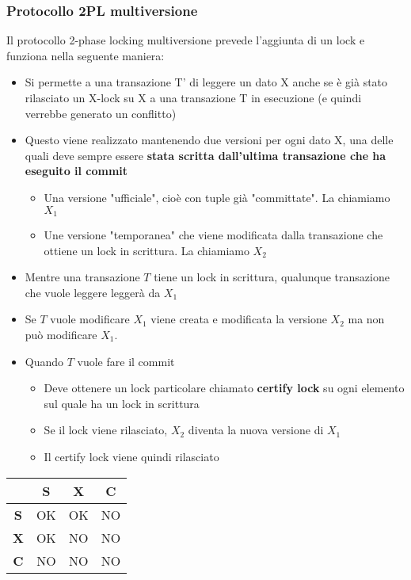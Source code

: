 \subsubsection{Protocollo 2PL multiversione}
Il protocollo 2-phase locking multiversione prevede l'aggiunta di un lock e funziona nella seguente maniera:
\begin{itemize}
    \item Si permette a una transazione T’ di leggere un dato X anche se è già stato rilasciato un X-lock su X a una transazione T in esecuzione (e quindi verrebbe generato un conflitto)
    
    \item Questo viene realizzato mantenendo due versioni per ogni dato X, una delle quali deve sempre essere \textbf{stata scritta dall’ultima transazione che ha eseguito il commit}
    \begin{itemize}
        \item Una versione "ufficiale", cioè con tuple già "committate". La chiamiamo $X_1$
        \item Une versione "temporanea" che viene modificata dalla transazione che ottiene un lock in scrittura. La chiamiamo $X_2$
    \end{itemize}
    
    \item Mentre una transazione $T$ tiene un lock in scrittura, qualunque transazione che vuole leggere legger\`a da $X_1$
    
    \item Se $T$ vuole modificare $X_1$ viene creata e modificata la versione $X_2$ ma non può modificare $X_1$.
    
    \item Quando $T$ vuole fare il commit
    \begin{itemize}
        \item Deve ottenere un lock particolare chiamato \textbf{certify lock} su ogni elemento sul quale ha un lock in scrittura
        
        \item Se il lock viene rilasciato, $X_2$ diventa la nuova versione di $X_1$
        
        \item Il certify lock viene quindi rilasciato
    \end{itemize}
\end{itemize}
\begin{table}[H]
\centering
\begin{tabular}{|c|c|c|c|}
\hline
           & \textbf{S} & \textbf{X} & \textbf{C} \\ \hline
\textbf{S} & OK         & OK         & NO         \\ \hline
\textbf{X} & OK         & NO         & NO         \\ \hline
\textbf{C} & NO         & NO         & NO         \\ \hline
\end{tabular}
\end{table}

